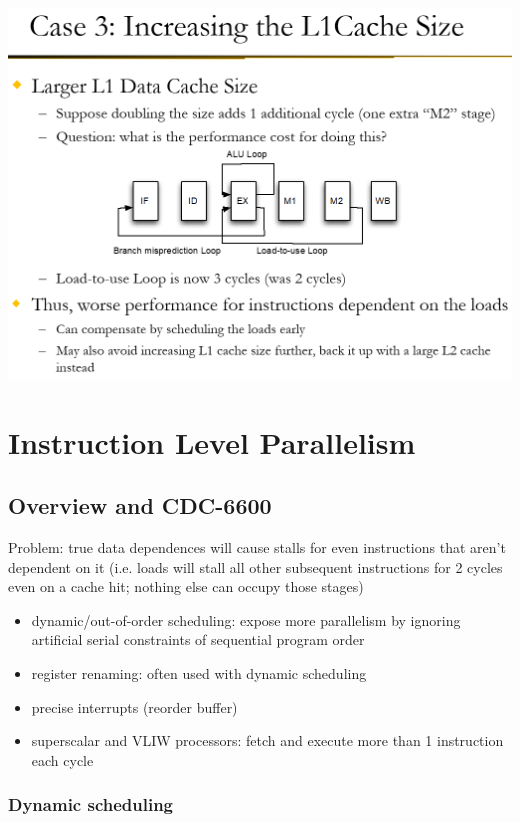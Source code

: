\documentclass[12pt]{extarticle}
\begin{document}
	\begin{center}
		\includegraphics[scale=0.5]{assets/loop-analysis-ex4.png}
	\end{center}


	\section{Instruction Level Parallelism}

	\subsection{Overview and CDC-6600}

	Problem: true data dependences will cause stalls for even instructions that aren't dependent on it (i.e. loads will 
	stall all other subsequent instructions for 2 cycles even on a cache hit; nothing else can occupy those stages)

	\begin{itemize}
		\item dynamic/out-of-order scheduling: expose more parallelism by ignoring artificial serial constraints of sequential program order
		\item register renaming: often used with dynamic scheduling
		\item precise interrupts (reorder buffer)
		\item superscalar and VLIW processors: fetch and execute more than 1 instruction each cycle
	\end{itemize}

	\subsubsection{Dynamic scheduling}
\end{document}
